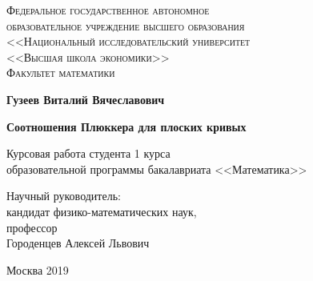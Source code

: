 \documentclass[a4paper, 12pt]{article}
\begin{document}
\begin{center}
{\scshape Федеральное государственное автономное\\
образовательное учреждение высшего образования\\
<<Национальный исследовательский университет\\
<<Высшая школа экономики>>\\[1ex]
Факультет математики\par}

\par\vfill

\textbf{\large Гузеев Виталий Вячеславович}

\vspace{1.5cm}

{\Large\bfseries
Соотношения Плюккера для плоских кривых
\par}

\vspace{1.5cm}

Курсовая работа студента 1 курса\\[1ex]
образовательной программы бакалавриата <<Математика>>
\par\vfill
\noindent\hspace{0.52\textwidth}\parbox[t]{0.48\textwidth}{%
Научный руководитель:\\[3pt]
кандидат физико-математических наук,\\
профессор\\
Городенцев Алексей Львович\\[2ex]
}%
\par\vfill
Москва 2019
\end{center}
\thispagestyle{empty}
\pagebreak
\end{document}
